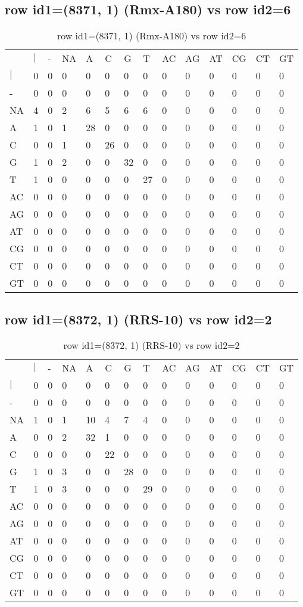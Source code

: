 \subsection{row id1=(8371, 1) (Rmx-A180) vs row id2=6}
\begin{center}
\begin{longtable}{|l|l|l|l|l|l|l|l|l|l|l|l|l|l|}
\caption{row id1=(8371, 1) (Rmx-A180) vs row id2=6} \label{table_dm412}\\
\hline
\\
\hline
&$|$&-&NA&A&C&G&T&AC&AG&AT&CG&CT&GT\\
$|$&0&0&0&0&0&0&0&0&0&0&0&0&0\\
-&0&0&0&0&0&0&0&0&0&0&0&0&0\\
NA&4&0&2&6&5&6&6&0&0&0&0&0&0\\
A&1&0&1&28&0&0&0&0&0&0&0&0&0\\
C&0&0&1&0&26&0&0&0&0&0&0&0&0\\
G&1&0&2&0&0&32&0&0&0&0&0&0&0\\
T&1&0&0&0&0&0&27&0&0&0&0&0&0\\
AC&0&0&0&0&0&0&0&0&0&0&0&0&0\\
AG&0&0&0&0&0&0&0&0&0&0&0&0&0\\
AT&0&0&0&0&0&0&0&0&0&0&0&0&0\\
CG&0&0&0&0&0&0&0&0&0&0&0&0&0\\
CT&0&0&0&0&0&0&0&0&0&0&0&0&0\\
GT&0&0&0&0&0&0&0&0&0&0&0&0&0\\
\hline
\end{longtable}
\end{center}

\subsection{row id1=(8372, 1) (RRS-10) vs row id2=2}
\begin{center}
\begin{longtable}{|l|l|l|l|l|l|l|l|l|l|l|l|l|l|}
\caption{row id1=(8372, 1) (RRS-10) vs row id2=2} \label{table_dm414}\\
\hline
\\
\hline
&$|$&-&NA&A&C&G&T&AC&AG&AT&CG&CT&GT\\
$|$&0&0&0&0&0&0&0&0&0&0&0&0&0\\
-&0&0&0&0&0&0&0&0&0&0&0&0&0\\
NA&1&0&1&10&4&7&4&0&0&0&0&0&0\\
A&0&0&2&32&1&0&0&0&0&0&0&0&0\\
C&0&0&0&0&22&0&0&0&0&0&0&0&0\\
G&1&0&3&0&0&28&0&0&0&0&0&0&0\\
T&1&0&3&0&0&0&29&0&0&0&0&0&0\\
AC&0&0&0&0&0&0&0&0&0&0&0&0&0\\
AG&0&0&0&0&0&0&0&0&0&0&0&0&0\\
AT&0&0&0&0&0&0&0&0&0&0&0&0&0\\
CG&0&0&0&0&0&0&0&0&0&0&0&0&0\\
CT&0&0&0&0&0&0&0&0&0&0&0&0&0\\
GT&0&0&0&0&0&0&0&0&0&0&0&0&0\\
\hline
\end{longtable}
\end{center}

